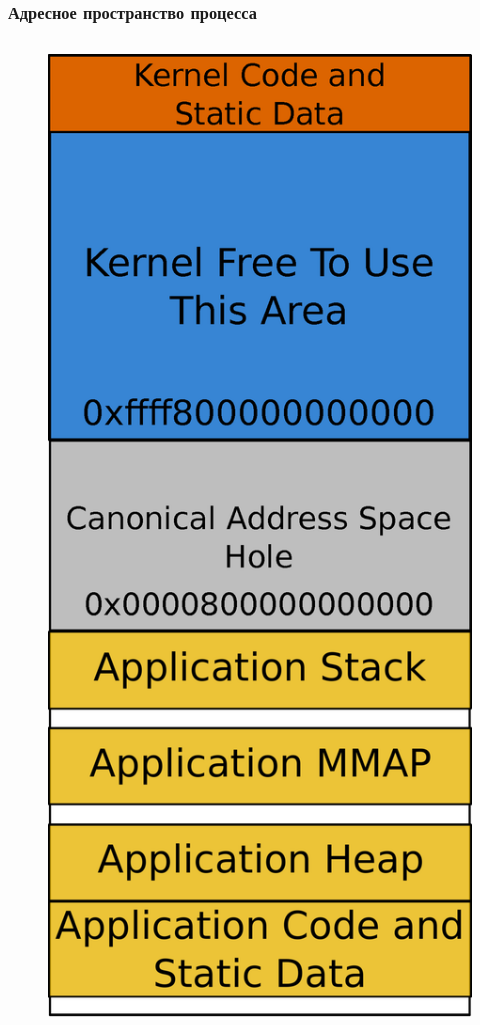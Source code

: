 \begin{frame}
\frametitle{Адресное пространство процесса}

\begin{columns}[T]
  \begin{column}{.4\textwidth}
    \begin{figure}
      \centering\includegraphics[height=.6\textheight]{memmap}

\end{figure}
\end{column}
\end{columns}
\end{frame}
